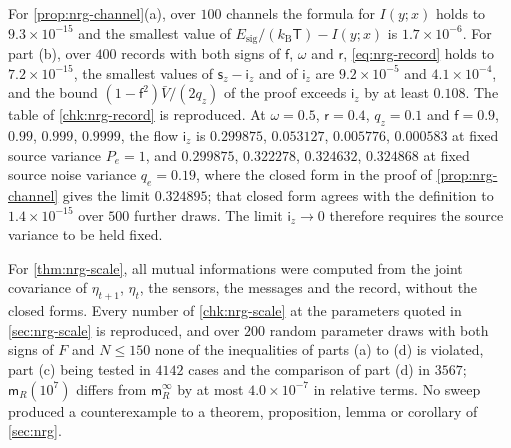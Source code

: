 \begin{numcheck}
For \cref{prop:nrg-channel}(a), over $100$ channels the formula for $I(y;x)$ holds to $9.3\times10^{-15}$ and the smallest value of $E_{\mathrm{sig}}/(k_{\mathrm B}\mathsf T)-I(y;x)$ is $1.7\times10^{-6}$. For part (b), over $400$ records with both signs of $\mathsf f$, $\omega$ and $\mathsf r$, \cref{eq:nrg-record} holds to $7.2\times10^{-15}$, the smallest values of $\mathsf s_z-\mathsf i_z$ and of $\mathsf i_z$ are $9.2\times10^{-5}$ and $4.1\times10^{-4}$, and the bound $(1-\mathsf f^2)\bar V/(2q_z)$ of the proof exceeds $\mathsf i_z$ by at least $0.108$. The table of \cref{chk:nrg-record} is reproduced. At $\omega=0.5$, $\mathsf r=0.4$, $q_z=0.1$ and $\mathsf f=0.9$, $0.99$, $0.999$, $0.9999$, the flow $\mathsf i_z$ is $0.299875$, $0.053127$, $0.005776$, $0.000583$ at fixed source variance $P_e=1$, and $0.299875$, $0.322278$, $0.324632$, $0.324868$ at fixed source noise variance $q_e=0.19$, where the closed form in the proof of \cref{prop:nrg-channel} gives the limit $0.324895$; that closed form agrees with the definition to $1.4\times10^{-15}$ over $500$ further draws. The limit $\mathsf i_z\to0$ therefore requires the source variance to be held fixed.

For \cref{thm:nrg-scale}, all mutual informations were computed from the joint covariance of $\eta_{t+1}$, $\eta_t$, the sensors, the messages and the record, without the closed forms. Every number of \cref{chk:nrg-scale} at the parameters quoted in \cref{sec:nrg-scale} is reproduced, and over $200$ random parameter draws with both signs of $F$ and $N\le150$ none of the inequalities of parts (a) to (d) is violated, part (c) being tested in $4142$ cases and the comparison of part (d) in $3567$; $\mathsf m_R(10^7)$ differs from $\mathsf m_R^\infty$ by at most $4.0\times10^{-7}$ in relative terms. No sweep produced a counterexample to a theorem, proposition, lemma or corollary of \cref{sec:nrg}.
\end{numcheck}
